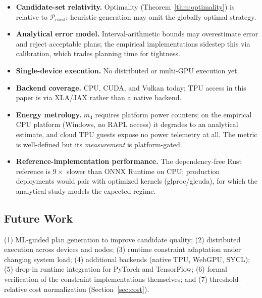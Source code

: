 \begin{itemize}[leftmargin=1.6em]
  \item \textbf{Candidate-set relativity.} Optimality
    (Theorem~\ref{thm:optimality}) is relative to
    $\mathcal{P}_{\text{cand}}$; heuristic generation may omit the
    globally optimal strategy.
  \item \textbf{Analytical error model.} Interval-arithmetic bounds may
    overestimate error and reject acceptable plans; the empirical
    implementations sidestep this via calibration, which trades
    planning time for tightness.
  \item \textbf{Single-device execution.} No distributed or multi-GPU
    execution yet.
  \item \textbf{Backend coverage.} CPU, CUDA, and Vulkan today; TPU
    access in this paper is via XLA/JAX rather than a native backend.
  \item \textbf{Energy metrology.} $m_4$ requires platform power
    counters; on the empirical CPU platform (Windows, no RAPL access)
    it degrades to an analytical estimate, and cloud TPU guests expose
    no power telemetry at all. The metric is well-defined but its
    \emph{measurement} is platform-gated.
  \item \textbf{Reference-implementation performance.} The
    dependency-free Rust reference is $9\times$ slower than ONNX
    Runtime on CPU; production deployments would pair \gate{} with
    optimized kernels (glproc/glcuda), for which the analytical study
    models the expected regime.
\end{itemize}

\subsection{Future Work}

(1) ML-guided plan generation to improve candidate quality; (2)
distributed execution across devices and nodes; (3) runtime constraint
adaptation under changing system load; (4) additional backends (native
TPU, WebGPU, SYCL); (5) drop-in runtime integration for PyTorch and
TensorFlow; (6) formal verification of the constraint implementations
themselves; and (7) threshold-relative cost normalization
(Section~\ref{sec:cost}).
